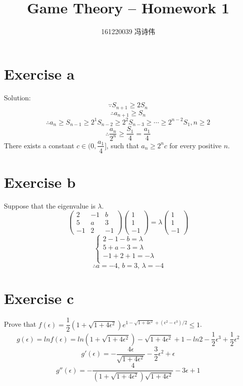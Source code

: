 \documentclass[a4papers]{ctexart}
\title{Game Theory -- Homework 1}
\author{161220039 冯诗伟 }
\date{}
\begin{document}
\maketitle
\section*{Exercise a}
\noindent Solution:
\[\because S_{n+1}\ge 2S_n \]\[\therefore a_{n+1}\ge S_n\]
\[\therefore a_n \ge S_{n-1} \ge 2^1 S_{n-2} \ge 2^2 S_{n-3} \ge \cdots \ge 2^{n-2}S_1 , n\ge 2\]
\[ \therefore \dfrac{a_n}{2^n} \ge \dfrac{S_1}{4} = \dfrac{a_1}{4}\]
There exists a constant $c \in (0,\dfrac{a_1}{4}]$, such that $a_n \ge 2^n c$ for every positive $n$.

\section*{Exercise b}
\noindent Suppose that the eigenvalue is $\lambda$.
\[ \begin{pmatrix}
2 &  -1 & b \\5 &  a &  3\\ -1 &  2 &  -1
\end{pmatrix}
\begin{pmatrix}
1 \\  1 \\ -1
\end{pmatrix}
= \lambda \begin{pmatrix}
1 \\  1 \\ -1
\end{pmatrix}
\]
\begin{equation*}
    \begin{cases}
        2-1-b=\lambda & \\
        5+a-3=\lambda & \\
        -1+2+1=-\lambda & \\
    \end{cases}
\end{equation*}
\[\therefore a=-4,\,b=3,\,\lambda=-4\]

\section*{Exercise c}
Prove that $f(\epsilon) = \dfrac{1}{2}(1+\sqrt{1+4\epsilon^2})e^{1-\sqrt{1+4\epsilon^2}+(\epsilon^2-\epsilon^3)/2}\le 1$.
\[ g(\epsilon)=lnf(\epsilon) =ln(1+\sqrt{1+4\epsilon^2})-\sqrt{1+4\epsilon^2}+1-ln2-\dfrac{1}{2}\epsilon^3+\dfrac{1}{2}\epsilon^2\]
\[ g'(\epsilon) = -\dfrac{4\epsilon}{\sqrt{1+4\epsilon^2}}-\dfrac{3}{2}\epsilon^2+\epsilon \]
\[ g''(\epsilon)=-\dfrac{4}{(1+\sqrt{1+4\epsilon^2})\sqrt{1+4\epsilon^2}}-3\epsilon+1\]
\end{document}

